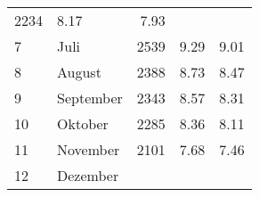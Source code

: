 \begin{longtable}{lXrrr}
       \num{2234} &
       \num[round-mode=places,round-precision=2]{8.17} &
         \num[round-mode=places,round-precision=2]{7.93} \\

     7 &
     \multicolumn{1}{X}{ Juli   } &


       \num{2539} &
       \num[round-mode=places,round-precision=2]{9.29} &
         \num[round-mode=places,round-precision=2]{9.01} \\

     8 &
     \multicolumn{1}{X}{ August   } &


       \num{2388} &
       \num[round-mode=places,round-precision=2]{8.73} &
         \num[round-mode=places,round-precision=2]{8.47} \\

     9 &
     \multicolumn{1}{X}{ September   } &


       \num{2343} &
       \num[round-mode=places,round-precision=2]{8.57} &
         \num[round-mode=places,round-precision=2]{8.31} \\

     10 &
     \multicolumn{1}{X}{ Oktober   } &


       \num{2285} &
       \num[round-mode=places,round-precision=2]{8.36} &
         \num[round-mode=places,round-precision=2]{8.11} \\

     11 &
     \multicolumn{1}{X}{ November   } &


       \num{2101} &
       \num[round-mode=places,round-precision=2]{7.68} &
         \num[round-mode=places,round-precision=2]{7.46} \\

     12 &
     \multicolumn{1}{X}{ Dezember   } &



\end{longtable}
